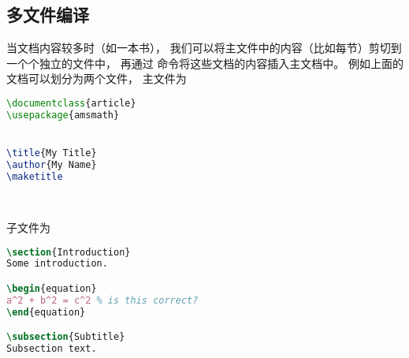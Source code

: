 \subsection{多文件编译}
当文档内容较多时（如一本书）， 我们可以将主文件中的内容（比如每节）剪切到一个个独立的文件中， 再通过 \verb`` 命令将这些文档的内容插入主文档中。 例如上面的文档可以划分为两个文件， 主文件为
\begin{lstlisting}[language=latex, caption=test.tex]
\documentclass{article}
\usepackage{amsmath}


\title{My Title}
\author{My Name}
\maketitle




\end{lstlisting}

子文件为
\begin{lstlisting}[language=latex, caption=section1.tex]
\section{Introduction}
Some introduction.

\begin{equation}
a^2 + b^2 = c^2 % is this correct?
\end{equation}

\subsection{Subtitle}
Subsection text.
\end{lstlisting}
